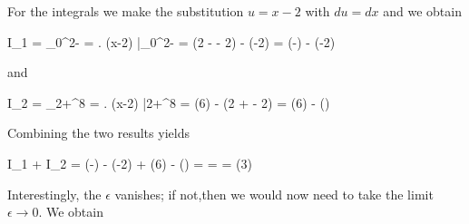 For the integrals we make the substitution $u = x-2$ with $du = dx$ and we obtain

\bee
I_1 = \int_0^{2-\epsilon}  = \left. \log(x-2) \right|_0^{2-\epsilon} = \log(2 - \epsilon - 2) - \log(-2) = \log(-\epsilon) - \log(-2)
\eee

and

\bee
I_2 = \int_{2+\epsilon}^8  = \left. \log(x-2) \right|{2+\epsilon}^8 = \log(6) - \log(2 + \epsilon - 2) = \log(6) - \log(\epsilon)
\eee

Combining the two results yields

\bee
I_1 + I_2 = \log(-\epsilon) - \log(-2) + \log(6) - \log(\epsilon) = \log \frac{-6\epsilon}{-2\epsilon} = \log {} = \log(3)
\eee

Interestingly, the $\epsilon$ vanishes; if not,then we would now need to take the limit $\epsilon \rightarrow 0$. We obtain


\bee
{}
\eee




